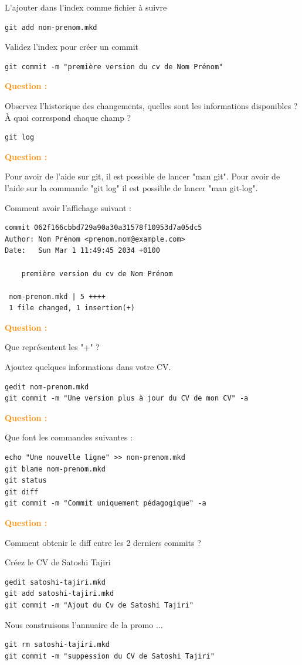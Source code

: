 \documentclass[a4paper]{article}
\newcounter{question}
\newcommand{\q}{
  \textcolor{DarkOrange}{\textbf{Question \thequestion : }}
  \addtocounter{question}{1}
  \newline
}
\begin{document}
L'ajouter dans l'index comme fichier à suivre
\begin{verbatim}
git add nom-prenom.mkd
\end{verbatim}

Validez l'index pour créer un commit
\begin{verbatim}
git commit -m "première version du cv de Nom Prénom"
\end{verbatim}

\q Observez l'historique des changements, quelles sont les informations disponibles ? À quoi correspond chaque champ ?
\begin{verbatim}
git log
\end{verbatim}

\q Pour avoir de l'aide sur git, il est possible de lancer "man git". Pour
avoir de l'aide sur la commande "git log" il est possible de lancer "man
git-log".

Comment avoir l'affichage suivant : 
\begin{verbatim}
commit 062f166cbbd729a90a30a31578f10953d7a05dc5
Author: Nom Prénom <prenom.nom@example.com>
Date:   Sun Mar 1 11:49:45 2034 +0100

    première version du cv de Nom Prénom

 nom-prenom.mkd | 5 ++++
 1 file changed, 1 insertion(+)
\end{verbatim}

\q Que représentent les "+"  ?

Ajoutez quelques informations dans votre CV.
\begin{verbatim}
gedit nom-prenom.mkd
git commit -m "Une version plus à jour du CV de mon CV" -a
\end{verbatim}

\q Que font les commandes suivantes :
\begin{verbatim}
echo "Une nouvelle ligne" >> nom-prenom.mkd
git blame nom-prenom.mkd
git status
git diff
git commit -m "Commit uniquement pédagogique" -a
\end{verbatim}

\q Comment obtenir le diff entre les 2 derniers commits ?

Créez le CV de Satoshi Tajiri
\begin{verbatim}
gedit satoshi-tajiri.mkd
git add satoshi-tajiri.mkd
git commit -m "Ajout du Cv de Satoshi Tajiri"
\end{verbatim}

Nous construisons l'annuaire de la promo ... 
\begin{verbatim}
git rm satoshi-tajiri.mkd
git commit -m "suppession du CV de Satoshi Tajiri"
\end{verbatim}
\end{document}
